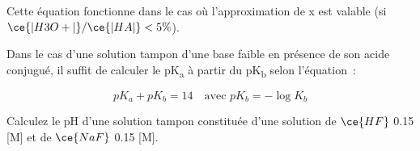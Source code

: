 \documentclass[
  11pt,
  a4paper,
  openany]{book}
\begin{document}
Cette équation fonctionne dans le cas où l'approximation de x est valable (si \(\ce{|H3O+|}/\ce{|HA|} < 5\%\)).

Dans le cas d'une solution tampon d'une base faible en présence de son acide conjugué, il suffit de calculer le pK\textsubscript{a} à partir du pK\textsubscript{b} selon l'équation~:

\[
pK_a + pK_b = 14 \quad \text{avec } pK_b = - \log K_b
\]

\clearpage

\begin{Exercise}
Calculez le pH d'une solution tampon constituée d'une solution de \(\ce{HF}\) 0.15 {[}M{]} et de \(\ce{NaF}\) 0.15 {[}M{]}.

\end{Exercise}
\end{document}
